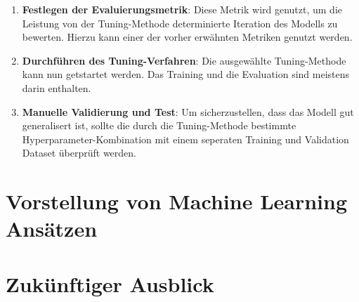 \documentclass[conference]{IEEEtran}
\begin{document}
\begin{enumerate}
\begin{itemize}
        \end{itemize}
    \item \textbf{Festlegen der Evaluierungsmetrik}: Diese Metrik wird genutzt, um die Leistung von der Tuning-Methode determinierte Iteration des Modells zu bewerten. Hierzu kann einer der vorher erwähnten Metriken genutzt werden.
    \item \textbf{Durchführen des Tuning-Verfahren}: Die ausgewählte Tuning-Methode kann nun getstartet werden. Das Training und die Evaluation sind meistens darin enthalten.
    \item \textbf{Manuelle Validierung und Test}: Um sicherzustellen, dass das Modell gut generalisert ist, sollte die durch die Tuning-Methode bestimmte Hyperparameter-Kombination mit einem seperaten Training und Validation Dataset überprüft werden.
\end{enumerate}

\newpage

\section{Vorstellung von Machine Learning Ansätzen}

\newpage

\section{Zukünftiger Ausblick}

\newpage


\end{document}
